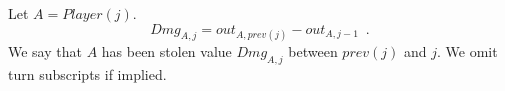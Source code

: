 {}
\begin{definition}[Damage]
  Let $A = Player\left(j\right)$.
  \begin{equation}
    Dmg_{A, j} = out_{A, prev\left(j\right)} - out_{A, j-1} \enspace.
  \end{equation}
  We say that $A$ has been stolen value $Dmg_{A, j}$ between $prev\left(j\right)$ and $j$. We omit turn subscripts if implied.
\end{definition}
